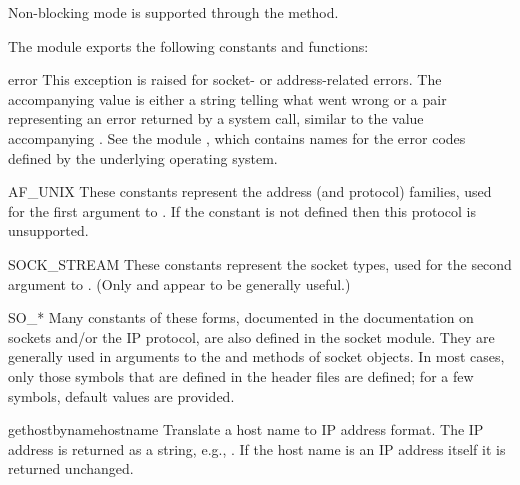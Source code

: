 Non-blocking mode is supported through the 
method.

The module  exports the following constants and functions:

\renewcommand{\indexsubitem}{(in module socket)}
\begin{excdesc}{error}
This exception is raised for socket- or address-related errors.
The accompanying value is either a string telling what went wrong or a
pair 
representing an error returned by a system
call, similar to the value accompanying .
See the module , which contains
names for the error codes defined by the underlying operating system.
\end{excdesc}

\begin{datadesc}{AF_UNIX}
These constants represent the address (and protocol) families,
used for the first argument to .  If the 
constant is not defined then this protocol is unsupported.
\end{datadesc}

\begin{datadesc}{SOCK_STREAM}
These constants represent the socket types,
used for the second argument to .
(Only  and
 appear to be generally useful.)
\end{datadesc}

\begin{datadesc}{SO_*}
Many constants of these forms, documented in the \UNIX{} documentation on
sockets and/or the IP protocol, are also defined in the socket module.
They are generally used in arguments to the  and
 methods of socket objects.  In most cases, only
those symbols that are defined in the \UNIX{} header files are defined;
for a few symbols, default values are provided.
\end{datadesc}

\begin{funcdesc}{gethostbyname}{hostname}
Translate a host name to IP address format.  The IP address is
returned as a string, e.g.,  .  If the host name
is an IP address itself it is returned unchanged.
\end{funcdesc}

